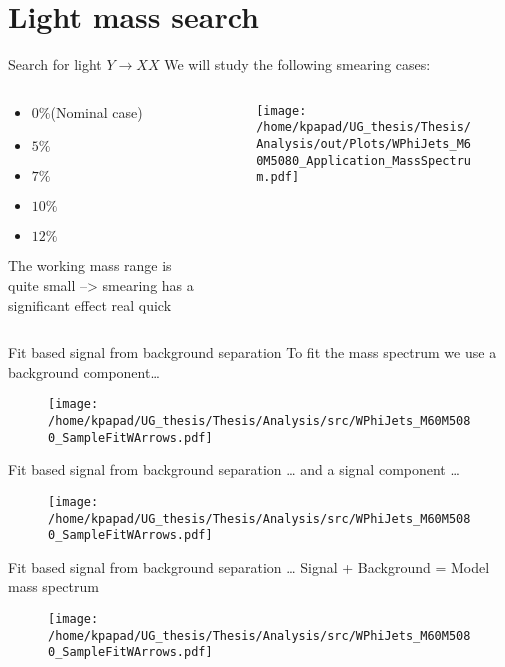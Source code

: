 \documentclass[bigger]{beamer}
\begin{document}
\section{Light mass search}
\label{sec:org94e8e10}
\begin{frame}[label={sec:orgd8b43b5}]{Search for light \(Y \rightarrow XX\)}
We will study the following smearing cases:
\begin{columns}
\begin{column}{0.5\columnwidth}
\begin{itemize}
\item \(0\%\)(Nominal case)
\item \(5\%\)
\item \(7\%\)
\item \(10\%\)
\item \(12\%\)
\end{itemize}
The working mass range is quite small --> smearing has a significant effect real quick 
\end{column}
\begin{column}{0.5\columnwidth}
\begin{figure}[h]
\centering
\texttt{[image: /home/kpapad/UG\_thesis/Thesis/Analysis/out/Plots/WPhiJets\_M60M5080\_Application\_MassSpectrum.pdf]}
\end{figure}
\end{column}
\end{columns}
\end{frame}
\begin{frame}[label={sec:org679be0a}]{Fit based signal from background separation}
To fit the mass spectrum we use a background component\ldots{}
\begin{figure}[hb]
\centering
\texttt{[image: /home/kpapad/UG\_thesis/Thesis/Analysis/src/WPhiJets\_M60M5080\_SampleFitWArrows.pdf]}
\end{figure}
\end{frame}
\begin{frame}[label={sec:orga69dbd0}]{Fit based signal from background separation}
\ldots{} and a signal component \ldots{}
\begin{figure}[hb]
\centering
\texttt{[image: /home/kpapad/UG\_thesis/Thesis/Analysis/src/WPhiJets\_M60M5080\_SampleFitWArrows.pdf]}
\end{figure}
\end{frame}
\begin{frame}[label={sec:org7151ae1}]{Fit based signal from background separation}
\ldots{} Signal + Background = Model mass spectrum
\begin{figure}[hb]
\centering
\texttt{[image: /home/kpapad/UG\_thesis/Thesis/Analysis/src/WPhiJets\_M60M5080\_SampleFitWArrows.pdf]}
\end{figure}
\end{frame}
\end{document}
